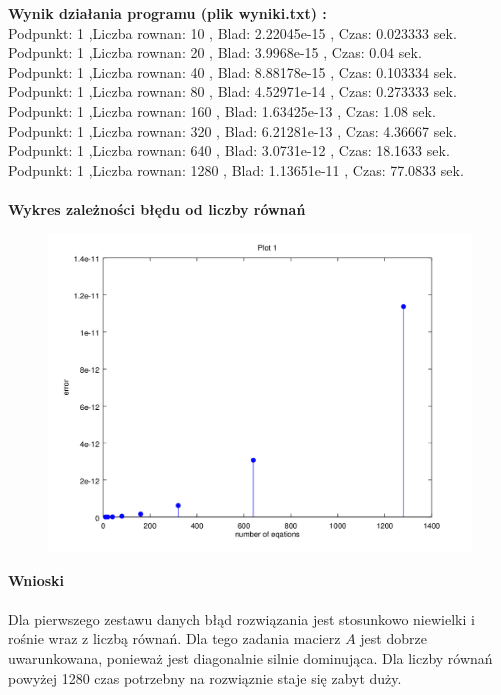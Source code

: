 \documentclass[a4paper, 11pt]{article}
\begin{document}
\textbf{Wynik działania programu (plik wyniki.txt) :}\\
Podpunkt: 1 ,Liczba rownan: 10 , Blad: 2.22045e-15 , Czas: 0.023333 sek. \\
Podpunkt: 1 ,Liczba rownan: 20 , Blad: 3.9968e-15 , Czas: 0.04 sek. \\
Podpunkt: 1 ,Liczba rownan: 40 , Blad: 8.88178e-15 , Czas: 0.103334 sek. \\
Podpunkt: 1 ,Liczba rownan: 80 , Blad: 4.52971e-14 , Czas: 0.273333 sek. \\
Podpunkt: 1 ,Liczba rownan: 160 , Blad: 1.63425e-13 , Czas: 1.08 sek. \\
Podpunkt: 1 ,Liczba rownan: 320 , Blad: 6.21281e-13 , Czas: 4.36667 sek. \\
Podpunkt: 1 ,Liczba rownan: 640 , Blad: 3.0731e-12 , Czas: 18.1633 sek. \\
Podpunkt: 1 ,Liczba rownan: 1280 , Blad: 1.13651e-11 , Czas: 77.0833 sek.\\
\\
\vspace{11cm}
\textbf{Wykres zależności błędu od liczby równań}\\
\begin{figure}[th]
\includegraphics[width=\textwidth]{wykres1}
\end{figure}

\vspace{2cm}
\textbf{Wnioski}\\
\\
Dla pierwszego zestawu danych błąd rozwiązania jest stosunkowo niewielki i rośnie wraz z liczbą równań. 
Dla tego zadania macierz $A$ jest dobrze uwarunkowana, ponieważ jest diagonalnie silnie dominująca. Dla liczby równań powyżej 1280 czas potrzebny na  rozwiąznie staje się zabyt duży. 
\end{document}
